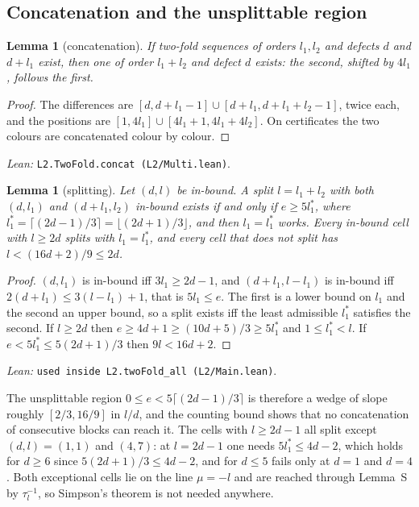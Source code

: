 \documentclass[11pt]{amsart}
\theoremstyle{plain}
\newtheorem{lemma}[theorem]{Lemma}
\theoremstyle{definition}
\theoremstyle{remark}
\newcommand{\lean}[1]{\par\smallskip
  {\small\raggedright\noindent\textit{Lean:} \texttt{#1}.\par}\smallskip}
\begin{document}
\subsection*{Concatenation and the unsplittable region}

\begin{lemma}[concatenation]\label{lem:concat}
If two-fold sequences of orders $l_1, l_2$ and defects $d$ and $d + l_1$ exist, then one
of order $l_1 + l_2$ and defect $d$ exists: the second, shifted by $4l_1$, follows the
first.
\end{lemma}

\begin{proof}
The differences are $[d,d+l_1-1] \cup [d+l_1,d+l_1+l_2-1]$, twice each, and the
positions are $[1,4l_1] \cup [4l_1+1,4l_1+4l_2]$. On certificates the two colours are
concatenated colour by colour.
\end{proof}
\lean{L2.TwoFold.concat (L2/Multi.lean)}

\begin{lemma}[splitting]\label{lem:split}
Let $(d,l)$ be in-bound. A split $l = l_1 + l_2$ with both $(d,l_1)$ and $(d+l_1,l_2)$
in-bound exists if and only if $e \ge 5l_1^*$, where $l_1^* = \lceil (2d-1)/3 \rceil =
\lfloor (2d+1)/3 \rfloor$, and then $l_1 = l_1^*$ works. Every in-bound cell with
$l \ge 2d$ splits with $l_1 = l_1^*$, and every cell that does not split has
$l < (16d+2)/9 \le 2d$.
\end{lemma}

\begin{proof}
$(d,l_1)$ is in-bound iff $3l_1 \ge 2d-1$, and $(d+l_1,l-l_1)$ is in-bound iff
$2(d+l_1) \le 3(l-l_1)+1$, that is $5l_1 \le e$. The first is a lower bound on $l_1$ and
the second an upper bound, so a split exists iff the least admissible $l_1^*$ satisfies
the second. If $l \ge 2d$ then $e \ge 4d+1 \ge (10d+5)/3 \ge 5l_1^*$ and
$1 \le l_1^* < l$. If $e < 5l_1^* \le 5(2d+1)/3$ then $9l < 16d+2$.
\end{proof}
\lean{used inside L2.twoFold\_all (L2/Main.lean)}

The unsplittable region $0 \le e < 5\lceil(2d-1)/3\rceil$ is therefore a wedge of slope
roughly $[2/3, 16/9]$ in $l/d$, and the counting bound shows that no concatenation of
consecutive blocks can reach it. The cells with $l \ge 2d-1$ all split except $(d,l) =
(1,1)$ and $(4,7)$: at $l = 2d-1$ one needs $5l_1^* \le 4d-2$, which holds for $d \ge 6$
since $5(2d+1)/3 \le 4d-2$, and for $d \le 5$ fails only at $d = 1$ and $d = 4$. Both
exceptional cells lie on the line $\mu = -l$ and are reached through Lemma~S by
$\tau_l^{-1}$, so Simpson's theorem is not needed anywhere.
\end{document}
